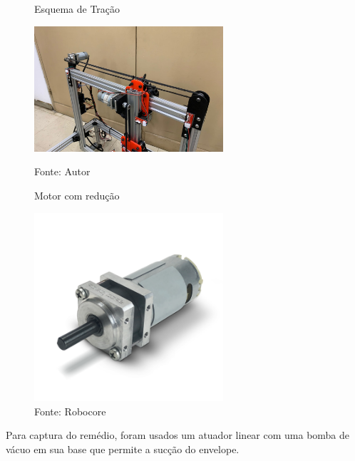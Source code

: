 \documentclass[../poliXuniversity_hospital_(USP)_report.tex]{subfiles}
\begin{document}
\begin{figure}[h]
\centering
    \begin{minipage}{0.5\textwidth}
        \centering
        \caption{Esquema de Tração}
        \centering %
        \includegraphics[width=7cm]{images/tração_golgi.jpeg}
        \caption*{Fonte: Autor}
        \label{figura: Esquema de Tração}
        
    \end{minipage}\hfill
    \begin{minipage}{0.5\textwidth}
    
        \centering
        \caption{ Motor com redução}
        \centering %
        \includegraphics[width=7cm]{images/motor_com_redu.png}
        \caption*{Fonte: Robocore}
        \label{figura: Motor com redução}
        
    \end{minipage}\hfill
\end{figure}

Para captura do remédio, foram usados um atuador linear com uma bomba de vácuo em sua base que permite a sucção do envelope.
\end{document}
